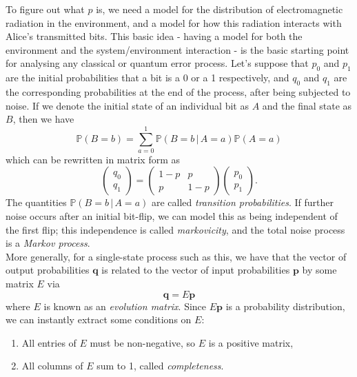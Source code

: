 \documentclass[12pt,a4paper]{report}
\numberwithin{equation}{section}
\theoremstyle{definition}
\theoremstyle{theorem}
\theoremstyle{theorem}
\theoremstyle{example}
\theoremstyle{definition}
\begin{document}
To figure out what $p$ is, we need a model for the distribution of electromagnetic radiation in the environment, and a model for how this radiation interacts with Alice's transmitted bits. This basic idea - having a model for both the environment and the system/environment interaction - is the basic starting point for analysing any classical or quantum error process. Let's suppose that $p_{0}$ and $p_{1}$ are the initial probabilities that a bit is a 0 or a 1 respectively, and $q_{0}$ and $q_{1}$ are the corresponding probabilities at the end of the process, after being subjected to noise. If we denote the initial state of an individual bit as $A$ and the final state as $B$, then we have
\begin{equation}
	\mathbb{P}(B=b)=\sum_{a=0}^{1}\mathbb{P}(B=b\,|\,A=a)\mathbb{P}(A=a)
\end{equation}
which can be rewritten in matrix form as
\begin{equation}
	\begin{pmatrix}
		q_{0}\\q_{1}
	\end{pmatrix}=\begin{pmatrix}1-p&p\\p&1-p\end{pmatrix}\begin{pmatrix}
	p_{0}\\p_{1}
\end{pmatrix}.
\end{equation}
The quantities $\mathbb{P}(B=b\,|\,A=a)$ are called \textit{transition probabilities}. If further noise occurs after an initial bit-flip, we can model this as being independent of the first flip; this independence is called \textit{markovicity}, and the total noise process is a \textit{Markov process}.\\
More generally, for a single-state process such as this, we have that the vector of output probabilities $\mathbf{q}$ is related to the vector of input probabilities $\mathbf{p}$ by some matrix $E$ via
\begin{equation}
	\mathbf{q}=E\mathbf{p}
\end{equation}
where $E$ is known as an \textit{evolution matrix}. Since $E\mathbf{p}$ is a probability distribution, we can instantly extract some conditions on $E$:
\begin{enumerate}
	\item All entries of $E$ must be non-negative, so $E$ is a positive matrix,
	\item All columns of $E$ sum to 1, called \textit{completeness}.
\end{enumerate}
\end{document}
